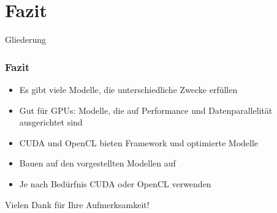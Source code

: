 \documentclass{sikslides}
\begin{document}
\section{Fazit}
\begin{frame}{Gliederung}
   
    	\tableofcontents[currentsection, subsectionstyle=show/show/hide]
\end{frame}

\begin{frame}
	\frametitle{Fazit}
\begin{itemize}

		\item Es gibt viele Modelle, die unterschiedliche Zwecke erfüllen \bigskip
		\item Gut für GPUs: Modelle, die auf Performance und Datenparallelität ausgerichtet sind \bigskip
		\item CUDA und OpenCL bieten Framework und optimierte Modelle  \bigskip
		\item Bauen auf den vorgestellten Modellen auf \bigskip
		\item Je nach Bedürfnis CUDA oder OpenCL verwenden


	\end{itemize}
\end{frame}


\begin{frame}
	
Vielen Dank für Ihre Aufmerksamkeit!
\end{frame}
\end{document}
